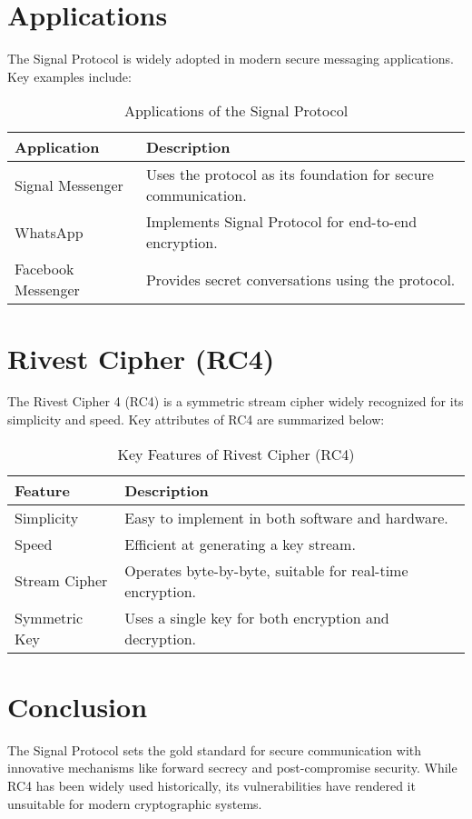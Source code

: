 \documentclass[11pt]{article}
\begin{document}
\section{Applications}
The Signal Protocol is widely adopted in modern secure messaging applications. Key examples include:

\begin{table}[h!]
\centering
\begin{tabular}{|p{4cm}|p{8cm}|}
\hline
\textbf{Application}  & \textbf{Description} \\ \hline
Signal Messenger      & Uses the protocol as its foundation for secure communication. \\ \hline
WhatsApp              & Implements Signal Protocol for end-to-end encryption. \\ \hline
Facebook Messenger    & Provides secret conversations using the protocol. \\ \hline
\end{tabular}
\caption{Applications of the Signal Protocol}
\end{table}

\section{Rivest Cipher (RC4)}
The Rivest Cipher 4 (RC4) is a symmetric stream cipher widely recognized for its simplicity and speed. Key attributes of RC4 are summarized below:

\begin{table}[h!]
\centering
\begin{tabular}{|p{4cm}|p{8cm}|}
\hline
\textbf{Feature}      & \textbf{Description} \\ \hline
Simplicity            & Easy to implement in both software and hardware. \\ \hline
Speed                 & Efficient at generating a key stream. \\ \hline
Stream Cipher         & Operates byte-by-byte, suitable for real-time encryption. \\ \hline
Symmetric Key         & Uses a single key for both encryption and decryption. \\ \hline
\end{tabular}
\caption{Key Features of Rivest Cipher (RC4)}
\end{table}

\section{Conclusion}
The Signal Protocol sets the gold standard for secure communication with innovative mechanisms like forward secrecy and post-compromise security. While RC4 has been widely used historically, its vulnerabilities have rendered it unsuitable for modern cryptographic systems.
\end{document}

